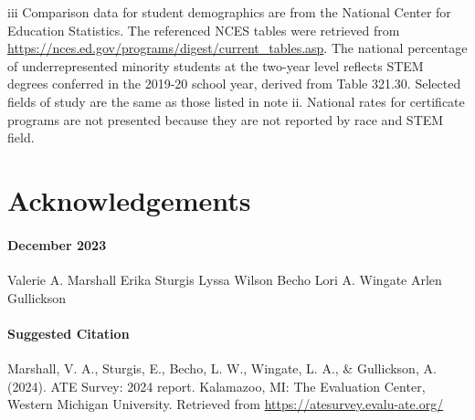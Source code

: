 \documentclass[
]{report}
\begin{document}
iii Comparison data for student demographics are from the National Center for Education Statistics. The referenced NCES tables were retrieved from \url{https://nces.ed.gov/programs/digest/current_tables.asp}. The national percentage of underrepresented minority students at the two-year level reflects STEM degrees conferred in the 2019-20 school year, derived from Table 321.30. Selected fields of study are the same as those listed in note ii. National rates for certificate programs are not presented because they are not reported by race and STEM field.

\hypertarget{acknowledgements}{%
\chapter*{Acknowledgements}\label{acknowledgements}}

\hypertarget{december-2023}{%
\subsubsection{December 2023}\label{december-2023}}

Valerie A. Marshall
Erika Sturgis
Lyssa Wilson Becho
Lori A. Wingate
Arlen Gullickson

\hypertarget{suggested-citation-1}{%
\subsubsection{Suggested Citation}\label{suggested-citation-1}}

Marshall, V. A., Sturgis, E., Becho, L. W., Wingate, L. A., \& Gullickson, A. (2024). ATE Survey: 2024 report. Kalamazoo, MI: The Evaluation Center, Western Michigan University. Retrieved from \url{https://atesurvey.evalu-ate.org/}

\printbibliography
\end{document}
